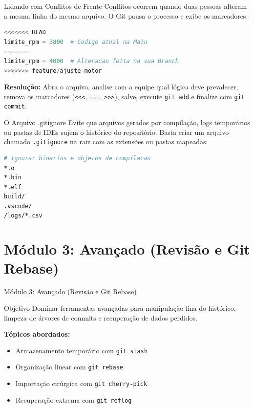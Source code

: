 \documentclass[10pt,aspectratio=169]{beamer}
\begin{document}
\begin{frame}[fragile]{Lidando com Conflitos de Frente}
    Conflitos ocorrem quando duas pessoas alteram a mesma linha do mesmo arquivo. O Git pausa o processo e exibe os marcadores:
    \vspace{0.2cm}
    \begin{lstlisting}[language=python]
<<<<<<< HEAD
limite_rpm = 3800  # Codigo atual na Main
=======
limite_rpm = 4000  # Alteracao feita na sua Branch
>>>>>>> feature/ajuste-motor
    \end{lstlisting}
    \vspace{0.1cm}
    \textbf{Resolução:} Abra o arquivo, analise com a equipe qual lógica deve prevalecer, remova os marcadores (\texttt{<<<}, \texttt{===}, \texttt{>>>}), salve, execute \texttt{git add} e finalize com \texttt{git commit}.
\end{frame}

\begin{frame}[fragile]{O Arquivo .gitignore}
    Evite que arquivos gerados por compilação, logs temporários ou pastas de IDEs sujem o histórico do repositório.
    \vspace{0.2cm}
    Basta criar um arquivo chamado \texttt{.gitignore} na raiz com as extensões ou pastas mapeadas:
    \vspace{0.2cm}
    \begin{lstlisting}[language=bash]
# Ignorar binarios e objetos de compilacao
*.o
*.bin
*.elf
build/
.vscode/
/logs/*.csv
    \end{lstlisting}
\end{frame}

\section{Módulo 3: Avançado (Revisão e Git Rebase)}

\begin{frame}{Módulo 3: Avançado (Revisão e Git Rebase)}
    \begin{block}{Objetivo}
        Dominar ferramentas avançadas para manipulação fina do histórico, limpeza de árvores de commits e recuperação de dados perdidos.
    \end{block}
    \vspace{0.5cm}
    \textbf{Tópicos abordados:}
    \begin{itemize}
        \item Armazenamento temporário com \texttt{git stash}
        \item Organização linear com \texttt{git rebase}
        \item Importação cirúrgica com \texttt{git cherry-pick}
        \item Recuperação extrema com \texttt{git reflog}
    \end{itemize}
\end{frame}
\end{document}
